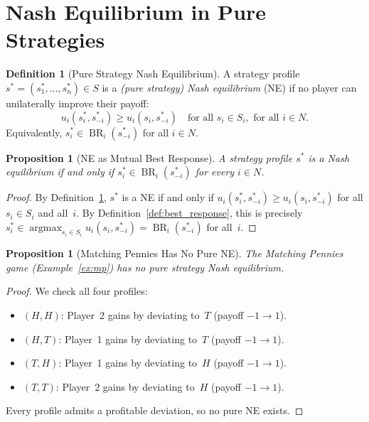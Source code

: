 \documentclass[11pt,a4paper]{article}
\theoremstyle{definition}
\newtheorem{definition}{Definition}[section]
\theoremstyle{plain}
\newtheorem{proposition}[theorem]{Proposition}
\theoremstyle{remark}
\DeclareMathOperator{\argmax}{argmax}
\DeclareMathOperator{\BR}{BR}
\begin{document}
\section{Nash Equilibrium in Pure Strategies}
\label{sec:nash_pure}

\begin{definition}[Pure Strategy Nash Equilibrium]
\label{def:nash_pure}
A strategy profile $s^* = (s_1^*, \ldots, s_n^*) \in S$ is a \emph{(pure strategy)
Nash equilibrium} (NE) if no player can unilaterally improve their payoff:
\[
    u_i(s_i^*, s_{-i}^*) \geq u_i(s_i, s_{-i}^*)
    \quad \text{for all } s_i \in S_i, \text{ for all } i \in N.
\]
Equivalently, $s_i^* \in \BR_i(s_{-i}^*)$ for all $i \in N$.
\end{definition}

\begin{proposition}[NE as Mutual Best Response]
\label{prop:ne_br}
A strategy profile $s^*$ is a Nash equilibrium if and only if
$s_i^* \in \BR_i(s_{-i}^*)$ for every $i \in N$.
\end{proposition}

\begin{proof}
By Definition~\ref{def:nash_pure}, $s^*$ is a NE if and only if
$u_i(s_i^*, s_{-i}^*) \geq u_i(s_i, s_{-i}^*)$ for all $s_i \in S_i$ and all~$i$.
By Definition~\ref{def:best_response}, this is precisely
$s_i^* \in \argmax_{s_i \in S_i} u_i(s_i, s_{-i}^*) = \BR_i(s_{-i}^*)$ for all~$i$.
\end{proof}

\begin{proposition}[Matching Pennies Has No Pure NE]
\label{prop:mp_no_pure}
The Matching Pennies game (Example~\ref{ex:mp}) has no pure strategy Nash equilibrium.
\end{proposition}

\begin{proof}
We check all four profiles:
\begin{itemize}[nosep]
    \item $(H,H)$: Player~2 gains by deviating to~$T$ (payoff $-1 \to 1$).
    \item $(H,T)$: Player~1 gains by deviating to~$T$ (payoff $-1 \to 1$).
    \item $(T,H)$: Player~1 gains by deviating to~$H$ (payoff $-1 \to 1$).
    \item $(T,T)$: Player~2 gains by deviating to~$H$ (payoff $-1 \to 1$).
\end{itemize}
Every profile admits a profitable deviation, so no pure NE exists.
\end{proof}
\end{document}
